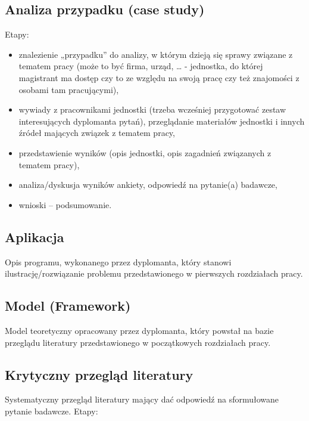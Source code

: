 \subsection{Analiza przypadku (case study)}

Etapy:

\begin{itemize}
	\item znalezienie „przypadku” do analizy, w którym dzieją się sprawy związane z tematem pracy (może to być firma, urząd, … - jednostka, do której magistrant ma dostęp czy to ze względu na swoją pracę czy też znajomości z osobami tam pracującymi),
	\item  wywiady z pracownikami jednostki (trzeba wcześniej przygotować zestaw interesujących dyplomanta pytań), przeglądanie materiałów jednostki i innych źródeł mających związek z tematem pracy,
	\item  przedstawienie wyników (opis jednostki, opis zagadnień związanych z tematem pracy),
	\item analiza/dyskusja wyników ankiety, odpowiedź na pytanie(a) badawcze,
	\item  wnioski – podsumowanie.
\end{itemize}


\subsection{Aplikacja}

Opis programu, wykonanego przez dyplomanta, który stanowi ilustrację/rozwiązanie problemu przedstawionego w pierwszych rozdziałach pracy.


\subsection{Model (Framework)}

Model teoretyczny opracowany przez dyplomanta, który powstał na bazie przeglądu literatury przedstawionego w początkowych rozdziałach pracy.


\subsection{Krytyczny przegląd literatury}

Systematyczny przegląd literatury mający dać odpowiedź na sformułowane pytanie badawcze. Etapy:

